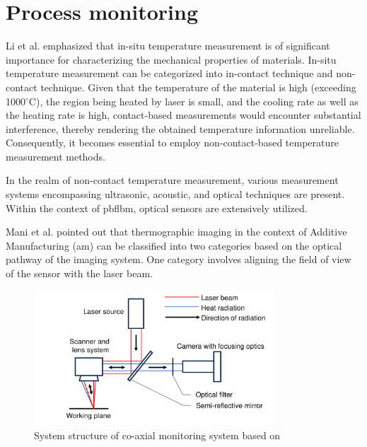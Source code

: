 \section{Process monitoring}%
Li et al. \cite{Li.2019} emphasized that in-situ temperature measurement is 
of significant importance for characterizing the mechanical properties of 
materials. In-situ temperature measurement can be categorized into 
in-contact technique and non-contact technique. Given that the temperature 
of the material is high (exceeding 1000$^\circ$C), the region being heated by laser 
is small, and the cooling rate as well as the heating rate is high, 
contact-based measurements would encounter substantial interference, 
thereby rendering the obtained temperature information unreliable. 
Consequently, it becomes essential to employ non-contact-based 
temperature measurement methods.


In the realm of non-contact temperature measurement, 
various measurement systems encompassing ultrasonic, acoustic, and optical 
techniques are present. Within the context of \gls{pbflbm}, 
optical sensors are extensively utilized\cite{Krauss.2012}.


Mani et al. \cite{Mani.2017} pointed out that thermographic imaging in the 
context of Additive Manufacturing (\gls{am}) can be classified into two 
categories based on the optical pathway of the imaging system. 
One category involves aligning the field of view of the sensor with 
the laser beam\cite{Craeghs.2010b,Craeghs.2012,Chivel.2010,Bammer.2010,Berumen.2010,Lott.2011,Yadroitsev.2014}. 

\begin{figure}[htbp]
    \centering
    \includegraphics[width=0.8\textwidth]{figures/co-axial.pdf}
    \caption{System structure of co-axial monitoring system based on \cite{Craeghs.2010b}}
    \label{fig: co-axial}
\end{figure}

